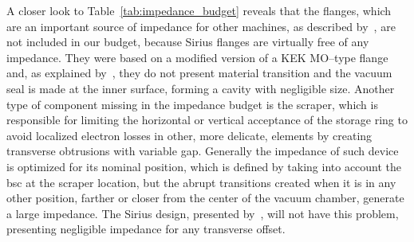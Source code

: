     A closer look to Table~\ref{tab:impedance_budget} reveals that the flanges, which are an important source of impedance for other machines, as described by~, are not included in our budget, because Sirius flanges are virtually free of any impedance. They were based on a modified version of a KEK MO--type flange~\cite{Suetsugu2005} and, as explained by~, they do not present material transition and the vacuum seal is made at the inner surface, forming a cavity with negligible size. Another type of component missing in the impedance budget is the scraper, which is responsible for limiting the horizontal or vertical acceptance of the storage ring to avoid localized electron losses in other, more delicate, elements by creating transverse obtrusions with variable gap. Generally the impedance of such device is optimized for its nominal position, which is defined by taking into account the \gls{bsc} at the scraper location, but the abrupt transitions created when it is in any other position, farther or closer from the center of the vacuum chamber, generate a large impedance. The Sirius design, presented by~, will not have this problem, presenting negligible impedance for any transverse offset.

